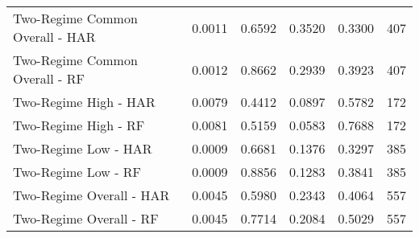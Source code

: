 \documentclass{article}
\begin{document}
\begin{table}
\begin{tabular}{lrrrrr}
Two-Regime Common Overall - HAR & 0.0011 &     0.6592 &   0.3520 & 0.3300 &    407 \\
    Two-Regime Common Overall - RF & 0.0012 &     0.8662 &   0.2939 & 0.3923 &    407 \\
            Two-Regime High - HAR & 0.0079 &     0.4412 &   0.0897 & 0.5782 &    172 \\
            Two-Regime High - RF & 0.0081 &     0.5159 &   0.0583 & 0.7688 &    172 \\
            Two-Regime Low - HAR & 0.0009 &     0.6681 &   0.1376 & 0.3297 &    385 \\
            Two-Regime Low - RF & 0.0009 &     0.8856 &   0.1283 & 0.3841 &    385 \\
        Two-Regime Overall - HAR & 0.0045 &     0.5980 &   0.2343 & 0.4064 &    557 \\
        Two-Regime Overall - RF & 0.0045 &     0.7714 &   0.2084 & 0.5029 &    557 \\
\bottomrule
\end{tabular}
\end{table}
\end{document}
